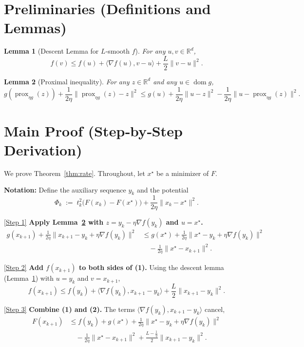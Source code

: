 \documentclass{article}
\newtheorem{lemma}{Lemma}
\newcommand{\prox}{\operatorname{prox}}
\newcommand{\grad}{\nabla}
\begin{document}
\section*{Preliminaries (Definitions and Lemmas)}
\begin{lemma}[Descent Lemma for $L$‑smooth $f$]\label{lem:descent}
For any $u,v\in\mathbb{R}^{d}$,
\[
f(v)\le f(u)+\langle\grad f(u),v-u\rangle+\frac{L}{2}\|v-u\|^{2}.
\]
\end{lemma}
\begin{lemma}[Proximal inequality]\label{lem:prox}
For any $z\in\mathbb{R}^{d}$ and any $u\in\operatorname{dom}g$,
\[
g(\prox_{\eta g}(z))+\frac{1}{2\eta}\|\prox_{\eta g}(z)-z\|^{2}
\le g(u)+\frac{1}{2\eta}\|u-z\|^{2}-\frac{1}{2\eta}\|u-\prox_{\eta g}(z)\|^{2}.
\]
\end{lemma}

\section*{Main Proof (Step‑by‑Step Derivation)}
We prove Theorem~\ref{thm:rate}.  Throughout, let $x^\star$ be a minimizer of $F$.

\noindent\textbf{Notation:} Define the auxiliary sequence $y_k$ and the potential
\[
\Phi_k \;:=\; t_k^{2}\bigl(F(x_k)-F(x^\star)\bigr) + \frac{1}{2\eta}\|x_k - x^\star\|^{2}.
\]

\noindent\underline{[Step 1]} \textbf{Apply Lemma~\ref{lem:prox} with $z = y_k-\eta\grad f(y_k)$ and $u = x^\star$.}
\[
\begin{aligned}
g(x_{k+1}) + \frac{1}{2\eta}\|x_{k+1}-y_k+\eta\grad f(y_k)\|^{2}
&\le g(x^\star)+\frac{1}{2\eta}\|x^\star-y_k+\eta\grad f(y_k)\|^{2}\\
&\quad -\frac{1}{2\eta}\|x^\star-x_{k+1}\|^{2}.
\end{aligned}
\tag{1}
\]

\noindent\underline{[Step 2]} \textbf{Add $f(x_{k+1})$ to both sides of (1).} Using the descent lemma (Lemma~\ref{lem:descent}) with $u=y_k$ and $v=x_{k+1}$,
\[
f(x_{k+1})\le f(y_k)+\langle\grad f(y_k),x_{k+1}-y_k\rangle+\frac{L}{2}\|x_{k+1}-y_k\|^{2}.
\tag{2}
\]

\noindent\underline{[Step 3]} \textbf{Combine (1) and (2).} The terms $\langle\grad f(y_k),x_{k+1}-y_k\rangle$ cancel,
\[
\begin{aligned}
F(x_{k+1}) &\le f(y_k)+g(x^\star) +\frac{1}{2\eta}\|x^\star-y_k+\eta\grad f(y_k)\|^{2} \\
&\quad -\frac{1}{2\eta}\|x^\star-x_{k+1}\|^{2}
+ \frac{L-\frac{1}{\eta}}{2}\|x_{k+1}-y_k\|^{2}.
\end{aligned}
\tag{3}
\]
\end{document}
